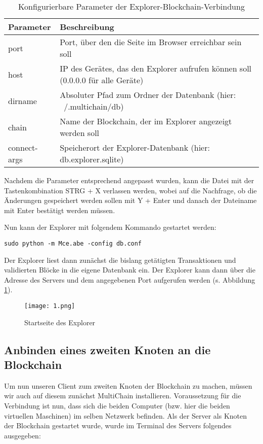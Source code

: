 \begin{table}[h]
	\begin{tabular}{|l|l|}
		\hline 
		\textbf{Parameter} & \textbf{Beschreibung} \\ 
		\hline 
		port & Port, über den die Seite im Browser erreichbar sein soll \\ 
		\hline 
		host & IP des Gerätes, das den Explorer aufrufen können soll (0.0.0.0 für alle Geräte) \\ 
		\hline 
		dirname & Absoluter Pfad zum Ordner der Datenbank (hier: ~/.multichain/db) \\ 
		\hline 
		chain & Name der Blockchain, der im Explorer angezeigt werden soll \\ 
		\hline 
		connect-args & Speicherort der Explorer-Datenbank (hier: db.explorer.sqlite) \\ 
		\hline 
	\end{tabular}
	\caption{Konfigurierbare Parameter der Explorer-Blockchain-Verbindung}
\end{table}

Nachdem die Parameter entsprechend angepasst wurden, kann die Datei mit der Tastenkombination STRG + X verlassen werden, wobei auf die Nachfrage, ob die Änderungen gespeichert werden sollen mit Y + Enter und danach der Dateiname mit Enter bestätigt werden müssen.

Nun kann der Explorer mit folgendem Kommando gestartet werden:

\begin{lstlisting}[frame=single]
sudo python -m Mce.abe -config db.conf
\end{lstlisting}

Der Explorer liest dann zunächst die bislang getätigten Transaktionen und validierten Blöcke in die eigene Datenbank ein. Der Explorer kann dann über die Adresse des Servers und dem angegebenen Port aufgerufen werden (s. Abbildung \ref{fig:1}).

\begin{figure}[h]
	\texttt{[image: 1.png]}
	\caption{Startseite des Explorer}
	\label{fig:1}
\end{figure}

\subsection{Anbinden eines zweiten Knoten an die Blockchain}
\label{subsec:trans-erstellung-mit-daten}
Um nun unseren Client zum zweiten Knoten der Blockchain zu machen, müssen wir auch auf diesem zunächst MultiChain installieren. Voraussetzung für die Verbindung ist nun, dass sich die beiden Computer (bzw. hier die beiden virtuellen Maschinen) im selben Netzwerk befinden. Als der Server als Knoten der Blockchain gestartet wurde, wurde im Terminal des Servers folgendes ausgegeben:

